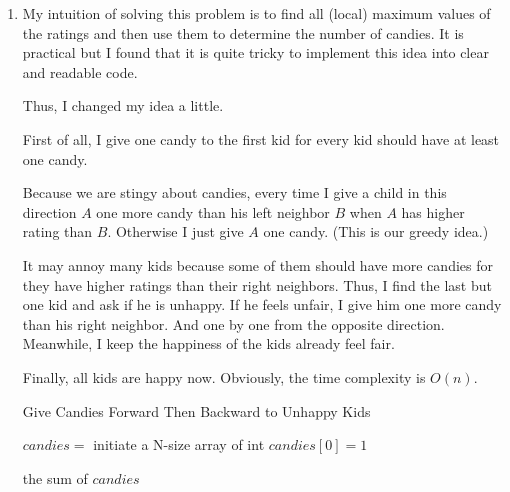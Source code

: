 \documentclass[12pt,a4paper]{article}
\makeatletter
\newtheorem*{solution}{Solution}
\renewenvironment{solution}[1][Solution] {\par\pushQED{\qed}\normalfont\topsep6\p@\@plus6\p@\relax\trivlist\item[\hskip\labelsep\bfseries#1\@addpunct{.}]\ignorespaces}{\popQED\endtrivlist\@endpefalse} \makeatother
\makeatother
\begin{document}
\begin{enumerate}
\begin{solution}

My intuition of solving this problem is to find all (local) maximum values of the ratings and then use them to determine the number of candies. It is practical but I found that it is quite tricky to implement this idea into clear and readable code.

Thus, I changed my idea a little. 

First of all, I give one candy to the first kid for every kid should have at least one candy.

Because we are stingy about candies, every time I give a child in this direction $A$ one more candy than his left neighbor $B$ when $A$ has higher rating than $B$. Otherwise I just give $A$ one candy. (This is our greedy idea.)

It may annoy many kids because some of them should have more candies for they have higher ratings than their right neighbors.
Thus, I find the last but one kid and ask if he is unhappy. If he feels unfair, I give him one more candy than his right neighbor. And one by one from the opposite direction. Meanwhile, I keep the happiness of the kids already feel fair.


Finally, all kids are happy now. Obviously, the time complexity is $O(n)$.


\begin{algorithm} 
  \label{alg:solution4}
  \caption{Give Candies Forward Then Backward to Unhappy Kids} 
  $candies = $ initiate a N-size array of int\;
  $candies[0] = 1$\; 


  \Return the sum of $candies$\; 
\end{algorithm}


\end{solution}
~\\
~\\

\end{enumerate}
\end{document}
